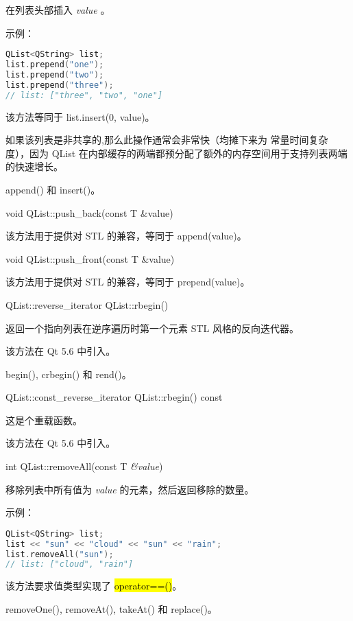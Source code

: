在列表头部插入 \emph{value} 。

示例：


\begin{lstlisting}[language=C++]
QList<QString> list;
list.prepend("one");
list.prepend("two");
list.prepend("three");
// list: ["three", "two", "one"]
\end{lstlisting}


该方法等同于 list.insert(0, value)。

如果该列表是非共享的,那么此操作通常会非常快（均摊下来为 常量时间复杂度），因为 QList 在内部缓存的两端都预分配了额外的内存空间用于支持列表两端的快速增长。


\begin{notice}[另请参阅]
append() 和 insert()。
\end{notice}

void QList::push\_back(const T \&value)

该方法用于提供对 STL 的兼容，等同于 append(value)。

void QList::push\_front(const T \&value)

该方法用于提供对 STL 的兼容，等同于 prepend(value)。

QList::reverse\_iterator QList::rbegin()

返回一个指向列表在逆序遍历时第一个元素 STL 风格的反向迭代器。

该方法在 Qt 5.6 中引入。

\begin{notice}[另请参阅]
begin(), crbegin() 和 rend()。
\end{notice}



QList::const\_reverse\_iterator QList::rbegin() const

这是个重载函数。

该方法在 Qt 5.6 中引入。

int QList::removeAll(const T \emph{\&value})

移除列表中所有值为 \emph{value} 的元素，然后返回移除的数量。

示例：

\begin{lstlisting}[language=C++]
QList<QString> list;
list << "sun" << "cloud" << "sun" << "rain";
list.removeAll("sun");
// list: ["cloud", "rain"]
\end{lstlisting}

该方法要求值类型实现了 \hl{operator==()}。

\begin{notice}[另请参阅]
removeOne(), removeAt(), takeAt() 和 replace()。
\end{notice}

